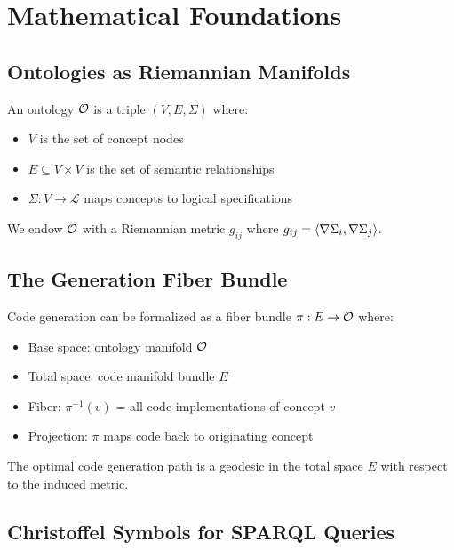 \chapter{Mathematical Foundations}
\label{ch:math}

\section{Ontologies as Riemannian Manifolds}

\begin{definition}
An ontology $\mathcal{O}$ is a triple $(V, E, \Sigma)$ where:
\begin{itemize}
    \item $V$ is the set of concept nodes
    \item $E \subseteq V \times V$ is the set of semantic relationships
    \item $\Sigma: V \to \mathcal{L}$ maps concepts to logical specifications
\end{itemize}
We endow $\mathcal{O}$ with a Riemannian metric $g_{ij}$ where $g_{ij} = \langle \nabla \Sigma_i, \nabla \Sigma_j \rangle$.
\end{definition}

\section{The Generation Fiber Bundle}

Code generation can be formalized as a fiber bundle $\pi: E \to \mathcal{O}$ where:
\begin{itemize}
    \item Base space: ontology manifold $\mathcal{O}$
    \item Total space: code manifold bundle $E$
    \item Fiber: $\pi^{-1}(v)$ = all code implementations of concept $v$
    \item Projection: $\pi$ maps code back to originating concept
\end{itemize}

\begin{theorem}
The optimal code generation path is a geodesic in the total space $E$ with respect to the induced metric.
\end{theorem}

\section{Christoffel Symbols for SPARQL Queries}


